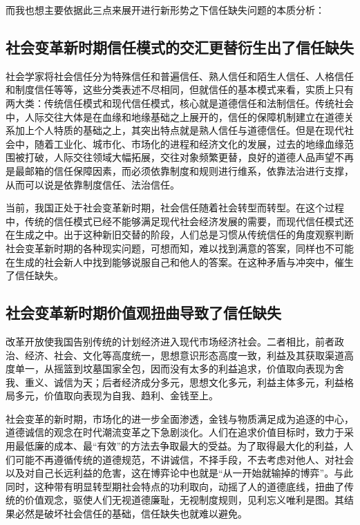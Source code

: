 \documentclass[UTF8]{ctexart}
\begin{document}
    而我也想主要依据此三点来展开进行新形势之下信任缺失问题的本质分析：

    \subsection{社会变革新时期信任模式的交汇更替衍生出了信任缺失}
    社会学家将社会信任分为特殊信任和普遍信任、熟人信任和陌生人信任、人格信任和制度信任等等，这些分类表述不尽相同，但就信任的基本模式来看，实质上只有两大类：传统信任模式和现代信任模式，核心就是道德信任和法制信任。传统社会中，人际交往大体是在血缘和地缘基础之上展开的，信任的保障机制建立在道德关系加上个人特质的基础之上，其突出特点就是熟人信任与道德信任。但是在现代社会中，随着工业化、城市化、市场化的进程和经济文化的发展，过去的地缘血缘范围被打破，人际交往领域大幅拓展，交往对象频繁更替，良好的道德人品声望不再是最邮箱的信任保障因素，而必须依靠制度和规则进行维系，依靠法治进行支撑，从而可以说是依靠制度信任、法治信任。

    当前，我国正处于社会变革新时期，社会信任随着社会转型而转型。在这个过程中，传统的信任模式已经不能够满足现代社会经济发展的需要，而现代信任模式还在生成之中。出于这种新旧交替的阶段，人们总是习惯从传统信任的角度观察判断社会变革新时期的各种现实问题，可想而知，难以找到满意的答案，同样也不可能在生成的社会新人中找到能够说服自己和他人的答案。在这种矛盾与冲突中，催生了信任缺失。

    \subsection{社会变革新时期价值观扭曲导致了信任缺失}
    改革开放使我国告别传统的计划经济进入现代市场经济社会。二者相比，前者政治、经济、社会、文化等高度统一，思想意识形态高度一致，利益及其获取渠道高度单一，从摇篮到坟墓国家全包，因而没有太多的利益追求，价值取向表现为舍我、重义、诚信为天；后者经济成分多元，思想文化多元，利益主体多元，利益格局多元，价值取向表现为自我、趋利、金钱至上。

    社会变革的新时期，市场化的进一步全面渗透，金钱与物质满足成为追逐的中心，道德诚信的观念在时代潮流变革之下急剧淡化。人们在追求价值目标时，致力于采用最低廉的成本、最“有效”的方法去争取最大的受益。为了取得最大化的利益，人们可能不再遵循传统的道德规范，不讲诚信，不择手段，不去考虑对他人、对社会以及对自己长远利益的危害，这在博弈论中也就是“从一开始就输掉的博弈”。与此同时，这种带有明显转型期社会特点的功利取向，动摇了人的道德底线，扭曲了传统的价值观念，驱使人们无视道德廉耻，无视制度规则，见利忘义唯利是图。其结果必然是破坏社会信任的基础，信任缺失也就难以避免。
\end{document}
